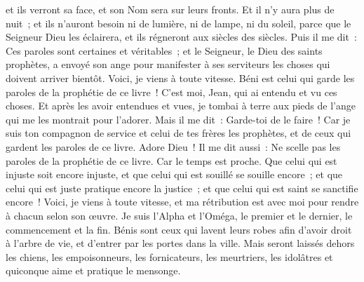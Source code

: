 \begin{multicols}{2}
et ils verront sa face, et son Nom sera sur leurs fronts.
Et il n'y aura plus de nuit~; et ils n'auront besoin ni de lumière, ni de lampe, ni du soleil, parce que le Seigneur Dieu les éclairera, et ils régneront aux siècles des siècles.
Puis il me dit~: Ces paroles sont certaines et véritables~; et le Seigneur, le Dieu des saints prophètes, a envoyé son ange pour manifester à ses serviteurs les choses qui doivent arriver bientôt.
Voici, je viens à toute vitesse. Béni est celui qui garde les paroles de la prophétie de ce livre~!
C'est moi, Jean, qui ai entendu et vu ces choses. Et après les avoir entendues et vues, je tombai à terre aux pieds de l'ange qui me les montrait pour l'adorer.
Mais il me dit~: Garde-toi de le faire~! Car je suis ton compagnon de service et celui de tes frères les prophètes, et de ceux qui gardent les paroles de ce livre. Adore Dieu~!
Il me dit aussi~: Ne scelle pas les paroles de la prophétie de ce livre. Car le temps est proche.
Que celui qui est injuste soit encore injuste, et que celui qui est souillé se souille encore~; et que celui qui est juste pratique encore la justice~; et que celui qui est saint se sanctifie encore~!
Voici, je viens à toute vitesse, et ma rétribution est avec moi pour rendre à chacun selon son œuvre.
Je suis l'Alpha et l'Oméga, le premier et le dernier, le commencement et la fin.
Bénis sont ceux qui lavent leurs robes afin d'avoir droit à l'arbre de vie, et d'entrer par les portes dans la ville.
Mais seront laissés dehors les chiens, les empoisonneurs, les fornicateurs, les meurtriers, les idolâtres et quiconque aime et pratique le mensonge.

\end{multicols}
